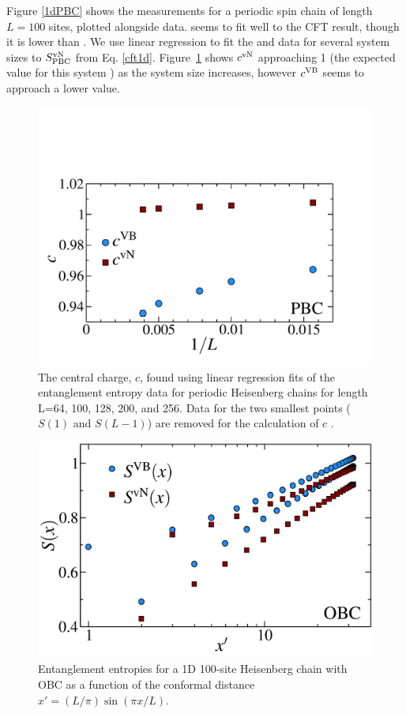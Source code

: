 Figure \ref{1dPBC} shows the \vb measurements for a periodic spin chain of length $L=100$ sites, plotted alongside \vn data.  \vb seems to fit well to the CFT result, though it is lower than \vN.
We use linear regression to fit the \vb and \vn data for several system sizes to $S_{\rm PBC}^{\rm vN}$ from Eq. \eqref{cft1d}. Figure~\ref{c1} shows $c^{\rm vN}$ approaching 1 (the expected value for this system ) as the system size increases, however $c^{\rm VB}$ seems to approach a lower value. 

\begin{figure} {
\includegraphics[width=6in]{./figures/paper1/figure1/thesis_c1.pdf} 
	\centering
	\caption[1D Results for VB EE and von Neumann EE]{
	The central charge, $c$, found using linear regression fits of the entanglement entropy data 	for periodic Heisenberg chains for length L=64, 100, 128, 200, and 256.  Data for the two smallest 	points ($S(1)$ and $S(L-1)$) are removed for the calculation of $c$ .
	\label{c1}}
} 
\end{figure}


\begin{figure} {
	\includegraphics[width=5in]{./figures/paper1/figure1/thesis_obc.pdf} 
	\centering
	\caption[1D OBC Results for VB EE and von Neumann EE]{
	Entanglement entropies for a 1D 100-site Heisenberg chain with OBC as a function of the conformal distance $x'  = (L/\pi)\sin (\pi x/L)$.
	\label{1dOBC}}}
\end{figure}

